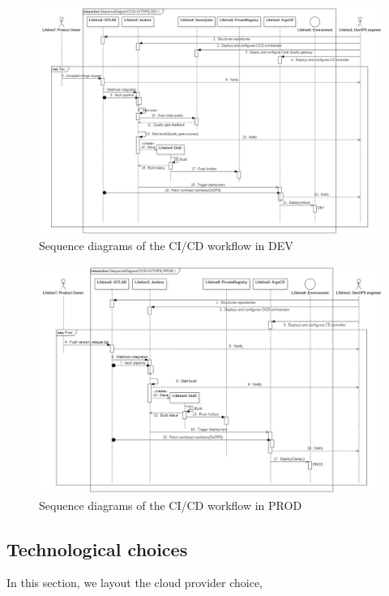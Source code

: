 \begin{figure}[H]\centering
\includegraphics[width=1.0\textwidth,angle=00]{assets/f5.jpg}
\caption{Sequence diagrams of the CI/CD workflow in DEV}
\label{fig:f5}
\end{figure}

\begin{figure}[H]\centering
\includegraphics[width=1.0\textwidth,angle=00]{assets/f6.jpg}
\caption{Sequence diagrams of the CI/CD workflow in PROD}
\label{fig:f6}
\end{figure}


\subsection{Technological choices }
In this section, we layout the cloud provider choice,
